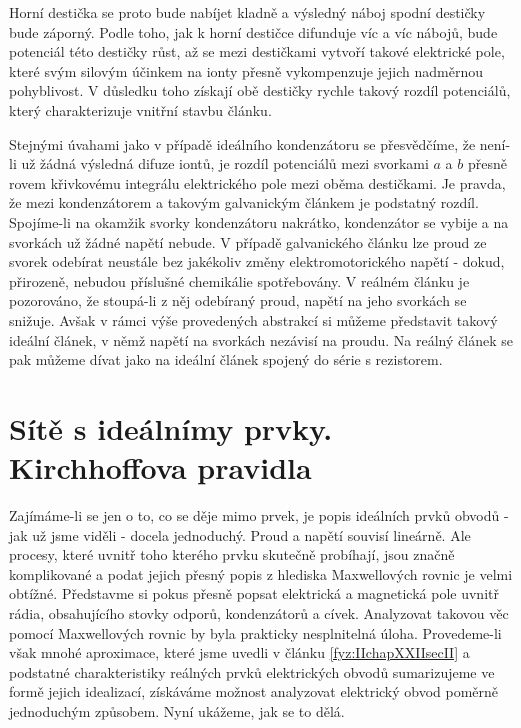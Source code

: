   Horní destička se proto bude nabíjet kladně a výsledný náboj spodní destičky bude záporný. Podle 
  toho, jak k horní destičce difunduje víc a víc nábojů, bude potenciál této destičky růst, až se 
  mezi destičkami vytvoří takové elektrické pole, které svým silovým účinkem na ionty přesně 
  vykompenzuje jejich nadměrnou pohyblivost. V důsledku toho získají obě destičky rychle takový 
  rozdíl potenciálů, který charakterizuje vnitřní stavbu článku.
  
  Stejnými úvahami jako v případě ideálního kondenzátoru se přesvědčíme, že není-li už žádná 
  výsledná difuze iontů, je rozdíl potenciálů mezi svorkami \(a\) a \(b\) přesně rovem křivkovému 
  integrálu elektrického pole mezi oběma destičkami. Je pravda, že mezi kondenzátorem a takovým 
  galvanickým článkem je podstatný rozdíl. Spojíme-li na okamžik svorky kondenzátoru nakrátko, 
  kondenzátor se vybije a na svorkách už žádné napětí nebude. V případě galvanického článku lze 
  proud ze svorek odebírat neustále bez jakékoliv změny elektromotorického napětí - dokud, 
  přirozeně, nebudou příslušné chemikálie spotřebovány. V reálném článku je pozorováno, že 
  stoupá-li z něj odebíraný proud, napětí na jeho svorkách se snižuje. Avšak v rámci výše 
  provedených abstrakcí si můžeme představit takový ideální článek, v němž napětí na svorkách 
  nezávisí na proudu. Na reálný článek se pak můžeme dívat jako na ideální článek spojený do série 
  s rezistorem.
  
\section{Sítě s ideálnímy prvky. Kirchhoffova pravidla}\label{fyz:IIchapXXIIsecIII}
  Zajímáme-li se jen o to, co se děje mimo prvek, je popis ideálních prvků obvodů - jak už jsme 
  viděli - docela jednoduchý. Proud a napětí souvisí lineárně. Ale procesy, které uvnitř toho 
  kterého prvku skutečně probíhají, jsou značně komplikované a podat jejich přesný popis z hlediska 
  Maxwellových rovnic je velmi obtížné. Představme si pokus přesně popsat elektrická a magnetická 
  pole uvnitř rádia, obsahujícího stovky odporů, kondenzátorů a cívek. Analyzovat takovou věc 
  pomocí Maxwellových rovnic by byla prakticky nesplnitelná úloha. Provedeme-li však mnohé 
  aproximace, které jsme uvedli v článku \ref{fyz:IIchapXXIIsecII} a podstatné charakteristiky 
  reálných prvků elektrických obvodů sumarizujeme ve formě jejich idealizací, získáváme možnost 
  analyzovat elektrický obvod poměrně jednoduchým způsobem. Nyní ukážeme, jak se to dělá.
  
